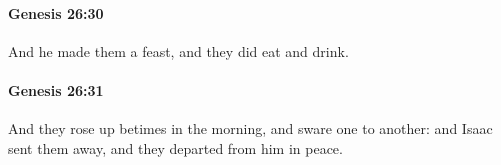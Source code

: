 		\paragraph{Genesis 26:30} %
			\label{GENESIS-26-30}

			And he made them a feast, and they did eat and drink.


		\paragraph{Genesis 26:31} %
			\label{GENESIS-26-31}

			And they rose up betimes in the morning, and sware one to another: and Isaac sent them away, and they departed from him in peace.


